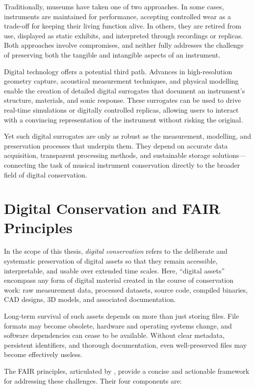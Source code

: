 Traditionally, museums have taken one of two approaches. In some cases, instruments are maintained for performance, accepting controlled wear as a trade-off for keeping their living function alive. In others, they are retired from use, displayed as static exhibits, and interpreted through recordings or replicas. Both approaches involve compromises, and neither fully addresses the challenge of preserving both the tangible and intangible aspects of an instrument.

Digital technology offers a potential third path. Advances in high-resolution geometry capture, acoustical measurement techniques, and physical modelling enable the creation of detailed digital surrogates that document an instrument’s structure, materials, and sonic response. These surrogates can be used to drive real-time simulations or digitally controlled replicas, allowing users to interact with a convincing representation of the instrument without risking the original.

Yet such digital surrogates are only as robust as the measurement, modelling, and preservation processes that underpin them. They depend on accurate data acquisition, transparent processing methods, and sustainable storage solutions—connecting the task of musical instrument conservation directly to the broader field of digital conservation.

\section{Digital Conservation and FAIR Principles}

In the scope of this thesis, \emph{digital conservation} refers to the deliberate and systematic preservation of digital assets so that they remain accessible, interpretable, and usable over extended time scales. Here, “digital assets” encompass any form of digital material created in the course of conservation work: raw measurement data, processed datasets, source code, compiled binaries, CAD designs, 3D models, and associated documentation.

Long-term survival of such assets depends on more than just storing files. File formats may become obsolete, hardware and operating systems change, and software dependencies can cease to be available. Without clear metadata, persistent identifiers, and thorough documentation, even well-preserved files may become effectively useless.

The FAIR principles, articulated by \textcite{wilkinson_fair_2016}, provide a concise and actionable framework for addressing these challenges. Their four components are:

